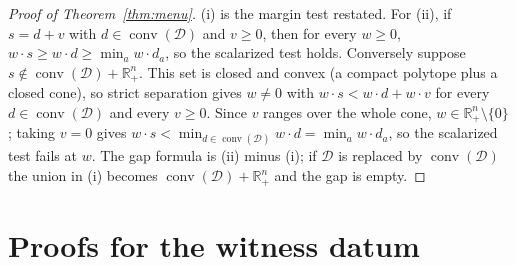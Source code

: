 \documentclass[preprint,11pt,authoryear]{elsarticle}
\theoremstyle{definition}
\theoremstyle{remark}
\newcommand{\conv}{\operatorname{conv}}
\newcommand{\Rp}{\mathbb{R}^n_+}
\begin{document}
\begin{proof}[Proof of Theorem~\ref{thm:menu}]
(i) is the margin test restated. For (ii), if $s=d+v$ with $d\in\conv(\mathcal D)$ and $v\ge0$, then for every $w\ge0$, $w\cdot s\ge w\cdot d\ge\min_aw\cdot d_a$, so the scalarized test holds. Conversely suppose $s\notin\conv(\mathcal D)+\Rp$. This set is closed and convex (a compact polytope plus a closed cone), so strict separation gives $w\ne0$ with $w\cdot s<w\cdot d+w\cdot v$ for every $d\in\conv(\mathcal D)$ and every $v\ge0$. Since $v$ ranges over the whole cone, $w\in\Rp\setminus\{0\}$; taking $v=0$ gives $w\cdot s<\min_{d\in\conv(\mathcal D)}w\cdot d=\min_aw\cdot d_a$, so the scalarized test fails at $w$. The gap formula is (ii) minus (i); if $\mathcal D$ is replaced by $\conv(\mathcal D)$ the union in (i) becomes $\conv(\mathcal D)+\Rp$ and the gap is empty.
\end{proof}

\section{Proofs for the witness datum}\label{app:witness}
\end{document}
